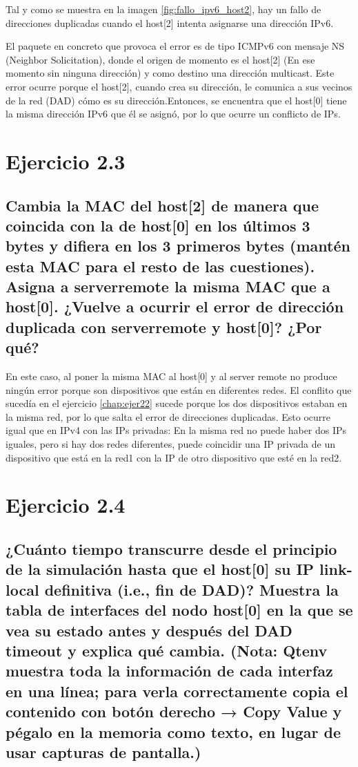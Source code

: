 Tal y como se muestra en la imagen \ref{fig:fallo_ipv6_host2}, hay un fallo de direcciones duplicadas cuando el host[2] intenta asignarse una dirección IPv6. 

El paquete en concreto que provoca el error es de tipo ICMPv6 con mensaje NS (Neighbor Solicitation), donde el origen de momento es el host[2] (En ese momento sin ninguna dirección) y como destino una dirección multicast. Este error ocurre porque el host[2], cuando crea su dirección, le comunica a sus vecinos de la red (DAD) cómo es su dirección.Entonces, se encuentra que el host[0] tiene la misma dirección IPv6 que él se asignó, por lo que ocurre un conflicto de IPs.

\section{Ejercicio 2.3}
\subsection{Cambia la MAC del host[2] de manera que coincida con la de host[0] en los últimos 3 bytes y difiera en los 3
primeros bytes (mantén esta MAC para el resto de las cuestiones). Asigna a serverremote la misma MAC que a
host[0]. ¿Vuelve a ocurrir el error de dirección duplicada con serverremote y host[0]? ¿Por qué?}

En este caso, al poner la misma MAC al host[0] y al server remote no produce ningún error porque son dispositivos que están en diferentes redes. 
El conflito que sucedía en el ejercicio \ref{chap:ejer22} sucede porque los dos dispositivos estaban en la misma red, por lo que salta el error de 
direcciones duplicadas. Esto ocurre igual que en IPv4 con las IPs privadas: En la misma red no puede haber dos IPs iguales, pero si hay dos redes diferentes, puede coincidir una IP privada de un dispositivo que está en la red1 con la IP de otro dispositivo que esté en la red2.

\section{Ejercicio 2.4}
\subsection{¿Cuánto tiempo transcurre desde el principio de la simulación hasta que el host[0] su IP link-local definitiva
(i.e., fin de DAD)? Muestra la tabla de interfaces del nodo host[0] en la que se vea su estado antes y después del
DAD timeout y explica qué cambia. (Nota: Qtenv muestra toda la información de cada interfaz en una línea;
para verla correctamente copia el contenido con botón derecho → Copy Value y pégalo en la memoria como
texto, en lugar de usar capturas de pantalla.)}

